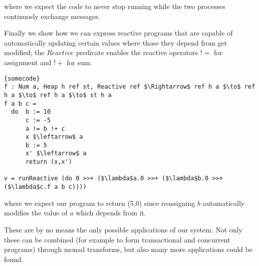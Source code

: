 \documentclass[a4paper]{article}
\begin{document}
where we expect the code to never stop running while the two processes continuosly exchange messages.

Finally we show how we can express reactive programs that are capable of automatically updating certain values where those they depend from get modified;
the $Reactive$ predicate enables the reactive operators $!=$ for assignment and $!+$ for sum:

\begin{lstlisting}[frame=tb,mathescape]{somecode}
f : Num a, Heap h ref st, Reactive ref $\Rightarrow$ ref h a $\to$ ref h a $\to$ ref h a $\to$ st h a
f a b c =
  do  b := 10
      c := -5
      a != b !+ c
      x $\leftarrow$ a
      b := 5
      x' $\leftarrow$ a
      return (x,x')

v = runReactive (do 0 >>+ ($\lambda$a.0 >>+ ($\lambda$b.0 >>+ ($\lambda$c.f a b c))))
\end{lstlisting}

where we expect our program to return (5,0) since reassigning $b$ automatically modifies the value of $a$ which depends from it.

These are by no means the only possible applications of our system. Not only these can be combined (for example to form transactional and
concurrent programs) through monad transforms, but also many more applications could be found.
\end{document}

